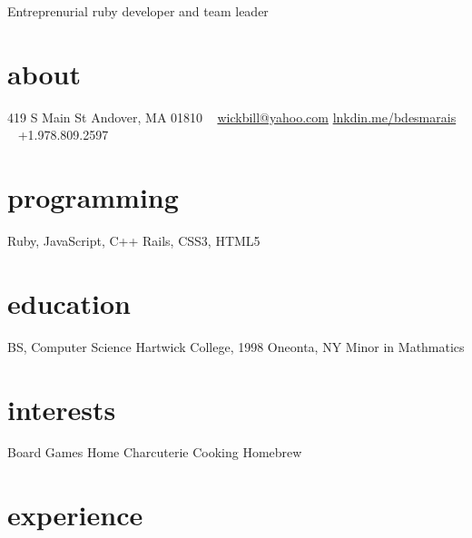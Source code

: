 \documentclass[]{friggeri-cv}
\begin{document}
       {Entreprenurial ruby developer and team leader}
       
\begin{aside}
  \section{about}
    419 S Main St
    Andover, MA 01810
    ~
    \href{mailto:wickbill@yahoo.com}{wickbill@yahoo.com}
    \href{http:/lnkdin.me/bdesmarais}{lnkdin.me/bdesmarais}
    ~
    +1.978.809.2597
  \section{programming}
    Ruby, JavaScript, C++
    Rails, CSS3, HTML5
  \section{education}
    BS, Computer Science
    Hartwick College, 1998
    Oneonta, NY
    Minor in Mathmatics
  \section{interests}
  Board Games
  Home Charcuterie
  Cooking
  Homebrew
\end{aside}

\section{experience}
\end{document}
